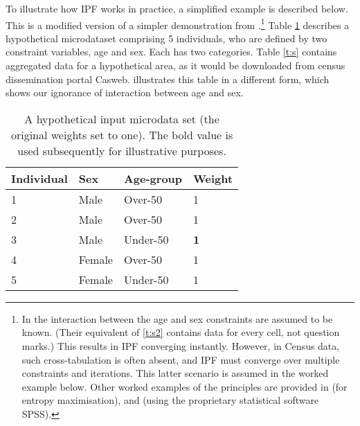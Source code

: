 %
%
%
%
%
%
%

To illustrate how IPF works in practice, a simplified example is described below.
This is a modified version of a simpler demonstration from
\citet{Ballas2005}.\footnote{In \citet{Ballas2005}
the interaction between the age and sex constraints are assumed to be known.
(Their equivalent of \cref{t:s2} contains data for every cell,
not question marks.) This results in IPF converging instantly.
However, in Census data, such cross-tabulation is
often absent, and IPF must converge over multiple constraints and
iterations. This latter scenario is assumed in the worked example below. Other
worked examples of the principles are provided in \citet[Appendix
3]{johnston1985geography} (for entropy maximisation), \citet{Norman1999a} and
\citet{Simpson2005} (using the proprietary statistical software SPSS).
}
Table \ref{t:w}  describes a
hypothetical microdataset comprising 5 individuals, who are defined by two
constraint variables, age and sex. Each has two categories.
Table \ref{t:s} contains aggregated data
for a hypothetical area, as it would be downloaded from census dissemination
portal Casweb.  illustrates this table in a different form,
which shows our ignorance of interaction between age and sex.


\begin{table}[h]
\centering
\caption[A hypothetical input microdata set]{A
hypothetical input microdata set (the original
weights set to one). The bold value is used subsequently for
illustrative purposes.}
\begin{tabular}{llll}
\toprule
{Individual } & {Sex} & {Age-group} & {Weight} \\
\midrule
1 & Male & Over-50 & 1 \\
2 & Male & Over-50 & 1 \\
3 & {Male} & {Under-50} & \textbf{1} \\
4 & Female & Over-50 & 1 \\
5 & Female & Under-50 & 1 \\
\bottomrule
\end{tabular}
\label{t:w}
\end{table}
\vspace{1cm}


